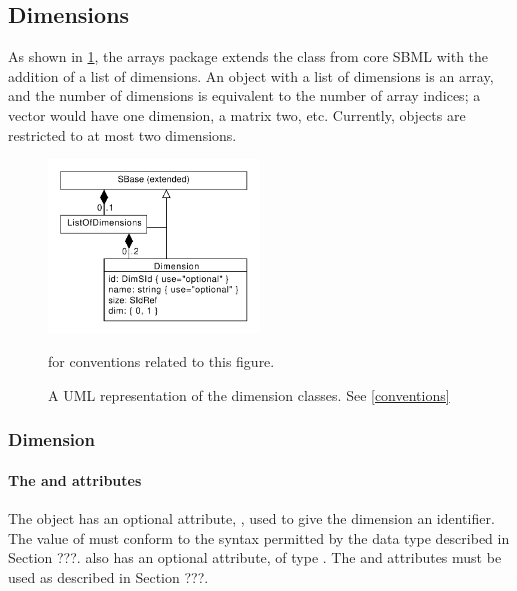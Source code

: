 \subsection{Dimensions}

As shown in \ref{fig:dimensions_uml}, the arrays package extends the \SBase class from core SBML with the addition of a list of dimensions.  An object with a list of dimensions is an array, and the number of dimensions is equivalent to the number of array indices; a vector would have one dimension, a matrix two, etc.  Currently, objects are restricted to at most two dimensions.  

\begin{figure}[tbhp]
  \centering
  \includegraphics[width=0.5\textwidth]{images/dimensionsUML.pdf}\\
  \caption{A UML representation of the dimension classes. See \ref{conventions}} for conventions related to this figure. \label{fig:dimensions_uml}
\end{figure}

\subsubsection{Dimension}
\label{sec:dimension}

\paragraph{The  and  attributes}

The \Dimension object has an optional attribute, , used to give the dimension an identifier.  The value of  must conform to the syntax permitted by the  data type described in Section ???.  \Dimension also has an optional  attribute, of type .  The  and  attributes must be used as described in Section ???.  

